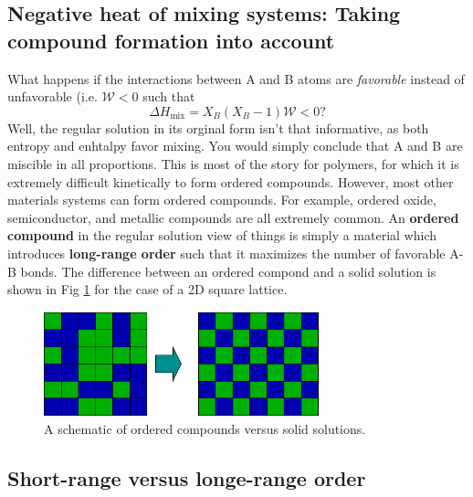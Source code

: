 \documentclass[12pt]{article}
\begin{document}
\subsection{Negative heat of mixing systems: Taking compound formation into account}

What happens if the interactions between A and B atoms are \textit{favorable} instead of unfavorable (i.e. \(\mathcal{W}<0\) such that \begin{equation*}
\Delta H_{\text{mix}}=X_B \left(X_B-1\right)\mathcal{W}<0?
\end{equation*}
Well, the regular solution in its orginal form isn't that informative, as both entropy and enhtalpy favor mixing. You would simply conclude
that A and B are miscible in all proportions. This is most of the story for polymers, for which it is extremely difficult kinetically to form ordered compounds. However, most other materials systems can form ordered compounds. For example, ordered oxide, semiconductor, and metallic
compounds are all extremely common. An \textbf{ordered compound} in the regular solution view of things is simply a material which introduces \textbf{long-range order} such that it maximizes the number of favorable A-B bonds. The difference between an ordered compond and a solid solution is shown in Fig \ref{orderedVsCompounds} for the case of a 2D square lattice.

\begin{figure}[h]
\centering
\includegraphics[width=8cm]{regularsolutionsandBraggwilliamsnotes_gr4}
\caption{A schematic of ordered compounds versus solid solutions.}
\label{orderedVsCompounds}
\end{figure}

\subsection{Short-range versus longe-range order}
\end{document}
